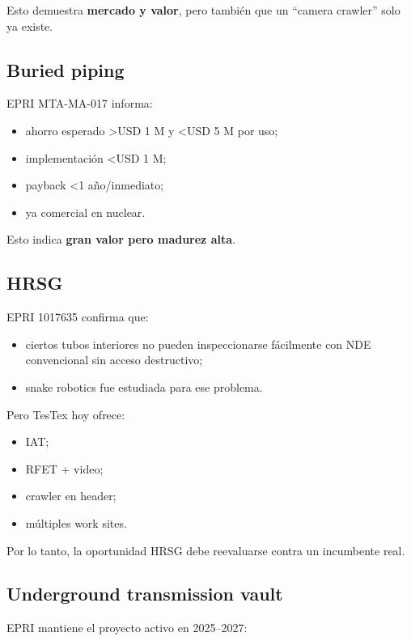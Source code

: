 \documentclass[11pt,a4paper]{article}
\begin{document}
Esto demuestra \textbf{mercado y valor}, pero también que un ``camera crawler'' solo ya existe.


\subsection*{Buried piping}
EPRI MTA-MA-017 informa:

\begin{itemize}
\item ahorro esperado \textgreater{}USD 1 M y \textless{}USD 5 M por uso;
\item implementación \textless{}USD 1 M;
\item payback \textless{}1 año/inmediato;
\item ya comercial en nuclear.
\end{itemize}

Esto indica \textbf{gran valor pero madurez alta}.


\subsection*{HRSG}
EPRI 1017635 confirma que:

\begin{itemize}
\item ciertos tubos interiores no pueden inspeccionarse fácilmente con NDE convencional sin acceso destructivo;
\item snake robotics fue estudiada para ese problema.
\end{itemize}

Pero TesTex hoy ofrece:

\begin{itemize}
\item IAT;
\item RFET + video;
\item crawler en header;
\item múltiples work sites.
\end{itemize}

Por lo tanto, la oportunidad HRSG debe reevaluarse contra un incumbente real.


\subsection*{Underground transmission vault}
EPRI mantiene el proyecto activo en 2025–2027:
\end{document}
